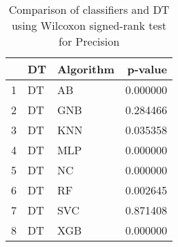 \begin{table}
\footnotesize
\caption{Comparison of classifiers and DT using Wilcoxon signed-rank test for Precision}
\label{tab:DT wilcoxon Precision comparison}
\begin{tabular}{lllr}
\hline
 & DT & Algorithm & p-value \\
\hline
1 & DT & AB & 0.000000 \\
2 & DT & GNB & 0.284466 \\
3 & DT & KNN & 0.035358 \\
4 & DT & MLP & 0.000000 \\
5 & DT & NC & 0.000000 \\
6 & DT & RF & 0.002645 \\
7 & DT & SVC & 0.871408 \\
8 & DT & XGB & 0.000000 \\
\hline
\end{tabular}
\end{table}
